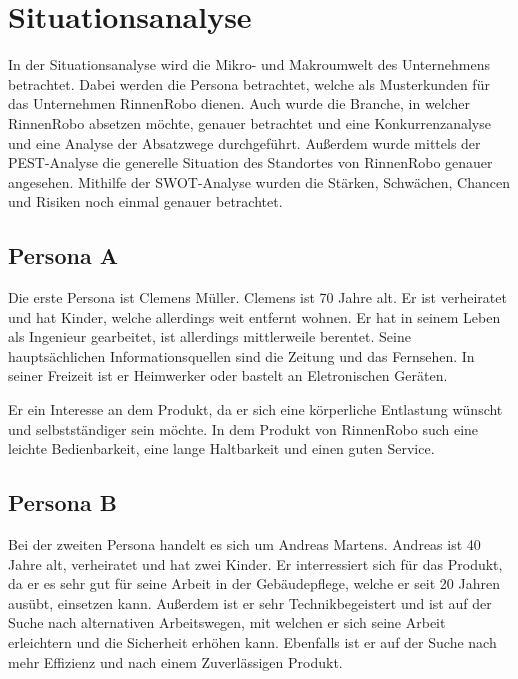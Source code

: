 \newcommand{\as}{\glqq}
\newcommand{\ad}{\grqq}
\newcommand{\adl}{\grqq{ }}

\newcommand{\fref}[1]{Abb. \ref{#1}} %

\section{Situationsanalyse} \label{sitana}
    In der Situationsanalyse wird die Mikro- und Makroumwelt des Unternehmens betrachtet. Dabei werden die Persona
    betrachtet, welche als Musterkunden für das Unternehmen RinnenRobo dienen. Auch wurde die Branche, in welcher 
    RinnenRobo absetzen möchte, genauer betrachtet und eine Konkurrenzanalyse und eine Analyse der Absatzwege 
    durchgeführt. Außerdem wurde mittels der PEST-Analyse die generelle Situation des Standortes von RinnenRobo genauer
    angesehen. Mithilfe der SWOT-Analyse wurden die Stärken, Schwächen, Chancen und Risiken noch einmal genauer 
    betrachtet.

    \subsection{Persona A} \label{personaA}
        Die erste Persona ist Clemens Müller. Clemens ist 70 Jahre alt. Er ist verheiratet und hat Kinder, welche
        allerdings weit entfernt wohnen. Er hat in seinem Leben als Ingenieur gearbeitet, ist allerdings mittlerweile
        berentet. Seine hauptsächlichen Informationsquellen sind die Zeitung und das Fernsehen. In seiner Freizeit ist
        er Heimwerker oder bastelt an Eletronischen Geräten. 

        Er ein Interesse an dem Produkt, da er sich eine körperliche Entlastung wünscht und selbstständiger sein
        möchte. In dem Produkt von RinnenRobo such eine leichte Bedienbarkeit, eine lange Haltbarkeit und einen guten
        Service.

    \subsection{Persona B} \label{personaB}
        Bei der zweiten Persona handelt es sich um Andreas Martens. Andreas ist 40 Jahre alt, verheiratet und hat
        zwei Kinder. Er interressiert sich für das Produkt, da er es sehr gut für seine Arbeit in der Gebäudepflege,
        welche er seit 20 Jahren ausübt, einsetzen kann. Außerdem ist er sehr Technikbegeistert und ist auf der Suche
        nach alternativen Arbeitswegen, mit welchen er sich seine Arbeit erleichtern und die Sicherheit erhöhen kann.
        Ebenfalls ist er auf der Suche nach mehr Effizienz und nach einem Zuverlässigen Produkt.

